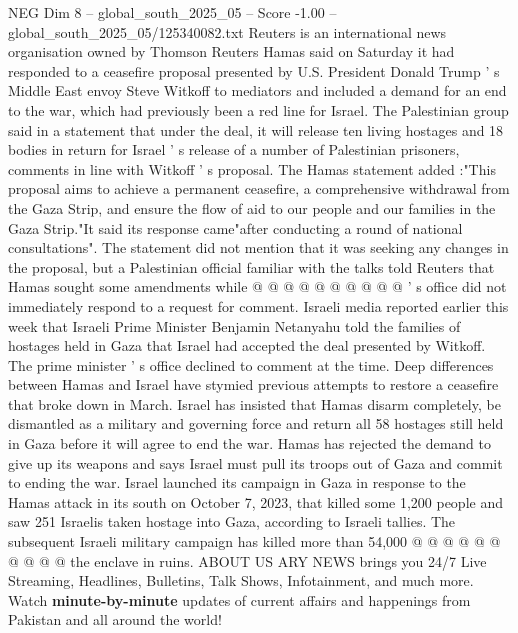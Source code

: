 \begin{textsample}{NEG Dim 8 – global\_south\_2025\_05 – Score -1.00 – global\_south\_2025\_05/125340082.txt}  \label{ex:f8_neg_311}
Reuters is an international news organisation owned by Thomson Reuters Hamas said on Saturday it had responded to a ceasefire proposal presented by U.S.
President Donald Trump ' s Middle East envoy Steve Witkoff to mediators and included a demand for an end to the war, which had previously been a red line for Israel.
The Palestinian group said in a statement that under the deal, it will release ten living hostages and 18 bodies in return for Israel ' s release of a number of Palestinian prisoners, comments in line with Witkoff ' s proposal.
The Hamas statement added :"This proposal aims to achieve a permanent ceasefire, a comprehensive withdrawal from the Gaza Strip, and ensure the flow of aid to our people and our families in the Gaza Strip."It said its response came"after conducting a round of national consultations".
The statement did not mention that it was seeking any changes in the proposal, but a Palestinian official familiar with the talks told Reuters that Hamas sought some amendments while @ @ @ @ @ @ @ @ @ @ ' s office did not immediately respond to a request for comment.
Israeli media reported earlier this week that Israeli Prime Minister Benjamin Netanyahu told the families of hostages held in Gaza that Israel had accepted the deal presented by Witkoff.
The prime minister ' s office declined to comment at the time.
Deep differences between Hamas and Israel have stymied previous attempts to restore a ceasefire that broke down in March.
Israel has insisted that Hamas disarm completely, be dismantled as a military and governing force and return all 58 hostages still held in Gaza before it will agree to end the war.
Hamas has rejected the demand to give up its weapons and says Israel must pull its troops out of Gaza and commit to ending the war.
Israel launched its campaign in Gaza in response to the Hamas attack in its south on October 7, 2023, that killed some 1,200 people and saw 251 Israelis taken hostage into Gaza, according to Israeli tallies.
The subsequent Israeli military campaign has killed more than 54,000 @ @ @ @ @ @ @ @ @ @ the enclave in ruins.
ABOUT US ARY NEWS brings you 24/7 Live Streaming, Headlines, Bulletins, Talk Shows, Infotainment, and much more.
Watch \textbf{minute-by-minute} updates of current affairs and happenings from Pakistan and all around the world!

\end{textsample}
